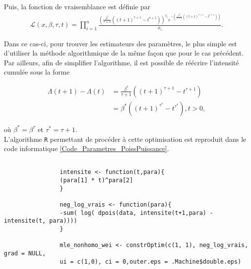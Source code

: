 			Puis, la fonction de vraisemblance est définie par
			\begin{align}
			\mathcal{L}\left( x,\beta,\tau,t \right) 
			= \prod_{i=1}^{n} \frac{ \left( \frac{\beta^\tau}{\tau+1}((t+1)^{\tau+1}-t^{\tau+1}) \right)^{x_i} e^{-(\frac{\beta^\tau}{\tau+1}((t+1)^{\tau+1}-t^{\tau+1}))} }{x_i}.\label{Vrais_Poiss_Puissance}
			\end{align}
			
			Dans ce cas-ci, pour trouver les estimateurs des paramètres, le plus simple est d'utiliser la méthode algorithmique de la même façon que pour le cas précédent.\\
			
			Par ailleurs, afin de simplifier l'algorithme, il est possible de réécrire l'intensité cumulée sous la forme
			
			\begin{align}
				\Lambda(t+1) - \Lambda(t) 
				&= \frac{\beta^\tau}{\tau+1}((t+1)^{\tau+1}-t^{\tau+1}) \nonumber\\
				&= \beta^* ((t+1)^{\tau^*} - t^{\tau^*}), t>0, \label{Intensite_Fonctio_Puissance}
			\end{align} 
			
			où $\beta^*=\beta^\tau$ et $\tau^*=\tau+1$.\\
			
			L'algorithme \texttt{R} permettant de procéder à cette optimisation est reproduit dans le code informatique \ref{Code_Parametres_PoissPuissance}.
			
			\begin{Code}\label{Code_Parametres_PoissPuissance}
			\begin{verbatim}
			
				intensite <- function(t,para){
				(para[1] * t)^para[2]
				}
				
				neg_log_vrais <- function(para){
				-sum( log( dpois(data, intensite(t+1,para) - intensite(t, para))))
				}
				
				mle_nonhomo_wei <- constrOptim(c(1, 1), neg_log_vrais, grad = NULL, 
				ui = c(1,0), ci = 0,outer.eps = .Machine$double.eps)
			\end{verbatim}
		\end{Code}
			
